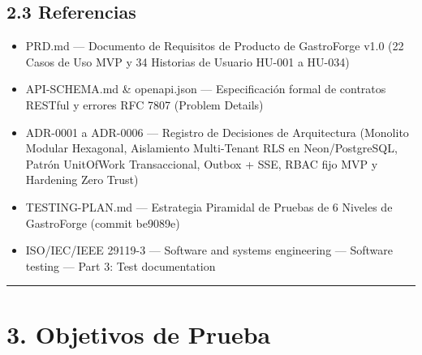 \documentclass[10pt,a4paper]{article}
\providecommand{\tightlist}{\setlength{\itemsep}{0pt}\setlength{\parskip}{0pt}}
\begin{document}
\endgroup\medskip


\subsection{2.3 Referencias}\label{23-referencias}

\begin{itemize}
\tightlist
\item
  PRD.md --- Documento de Requisitos de Producto de GastroForge v1.0 (22 Casos de Uso MVP y 34 Historias de Usuario HU-001 a HU-034)
\item
  API-SCHEMA.md \& openapi.json --- Especificación formal de contratos RESTful y errores RFC 7807 (Problem Details)
\item
  ADR-0001 a ADR-0006 --- Registro de Decisiones de Arquitectura (Monolito Modular Hexagonal, Aislamiento Multi-Tenant RLS en Neon/PostgreSQL, Patrón UnitOfWork Transaccional, Outbox + SSE, RBAC fijo MVP y Hardening Zero Trust)
\item
  TESTING-PLAN.md --- Estrategia Piramidal de Pruebas de 6 Niveles de GastroForge (commit be9089e)
\item
  ISO/IEC/IEEE 29119-3 --- Software and systems engineering --- Software testing --- Part 3: Test documentation
\end{itemize}

\begin{center}\rule{0.5\linewidth}{0.5pt}\end{center}


\section{3. Objetivos de Prueba}\label{3-objetivos-de-prueba}

\begingroup\singlespacing\footnotesize\setlength{\parskip}{0pt}
\end{document}
